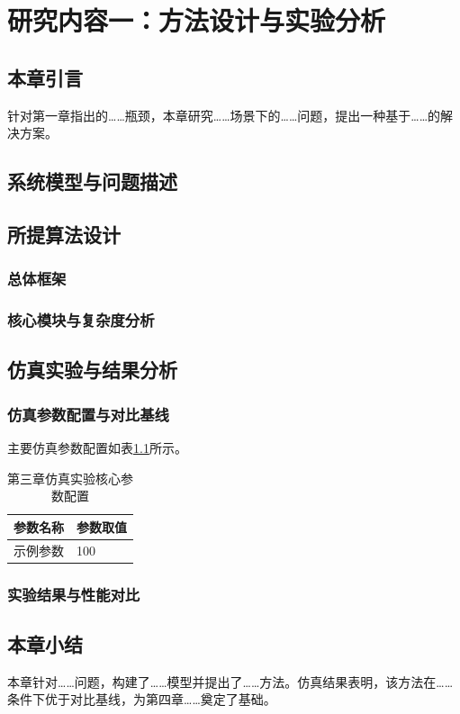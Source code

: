 \chapter{研究内容一：方法设计与实验分析}

\section{本章引言}
针对第一章指出的……瓶颈，本章研究……场景下的……问题，提出一种基于……的解决方案。

\section{系统模型与问题描述}

\section{所提算法设计}
\subsection{总体框架}
\subsection{核心模块与复杂度分析}

\section{仿真实验与结果分析}
\subsection{仿真参数配置与对比基线}
主要仿真参数配置如表\ref{tab:chap3_params}所示。
\begin{table}[htbp]
  \centering
  \caption{第三章仿真实验核心参数配置}
  \label{tab:chap3_params}
  \begin{tabular}{ll}
    \toprule
    参数名称 & 参数取值 \\
    \midrule
    示例参数 & 100 \\
    \bottomrule
  \end{tabular}
\end{table}

\subsection{实验结果与性能对比}

\section{本章小结}
本章针对……问题，构建了……模型并提出了……方法。仿真结果表明，该方法在……条件下优于对比基线，为第四章……奠定了基础。
